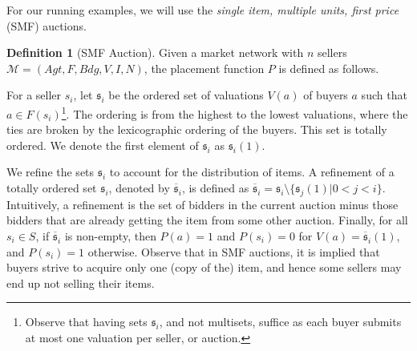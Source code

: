 \documentclass[letterpaper]{article} %
\theoremstyle{definition}
\newtheorem{definition}{Definition}
\begin{document}


For our running examples, we will use the \emph{single item, multiple units, first price} (SMF) auctions.
\begin{definition}[SMF Auction]
\label{def:SMF}
  Given a market network with $n$ sellers  $\mathcal{M} = (Agt, F, Bdg, V, I, N)$, the placement function $P$ is defined as follows.

  For a seller $s_i$, let $\mathfrak{s}_i$ be the ordered set of valuations $V(a)$ of buyers $a$ such that $a \in F(s_i)$\footnote{Observe that having sets $\mathfrak{s}_i$, and not multisets,  suffice as each buyer submits at most one valuation per seller, or auction.}. The ordering is from the highest to the lowest valuations, where the ties are broken by the lexicographic ordering of the buyers. %
  This set is totally ordered. We denote the first element of $\mathfrak{s}_i$ as $\mathfrak{s}_i (1)$.

  We refine the sets $\mathfrak{s}_i$ to account for the distribution of items. A refinement of a totally ordered set $\mathfrak{s}_i$, denoted by $\overline{\mathfrak{s}}_i$, is defined as $\overline{\mathfrak{s}}_i = \mathfrak{s}_i \setminus \{\mathfrak{s}_j (1)| 0 < j < i\}$. Intuitively, a refinement is the set of bidders in the current auction minus those bidders that are already getting the item from some other auction.  
Finally, for all $s_i \in S$, if $\overline{\mathfrak{s}}_i$ is non-empty, then $P(a) = 1$ and $P(s_i) = 0$ for $V(a) = \overline{\mathfrak{s}}_i (1)$, and $P(s_i) = 1$ otherwise. Observe that in SMF auctions, it is implied that buyers strive to acquire only one (copy of the) item, and hence some sellers may end up not selling their items.


\end{definition}
\end{document}
